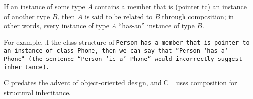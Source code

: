 If an instance of some type $A$ contains a member that is (pointer to) an instance
of another type $B$, then $A$ is said to be related to $B$ through composition;
in other words, every instance of type $A$ ``has-an'' instance of type $B$.

For example, if the class structure of \tt{Person} has a member
that is pointer to an instance of class \tt{Phone}, then we
can say that ``\tt{Person} `has-a' \tt{Phone}'' (the sentence
``\tt{Person} `is-a' \tt{Phone}'' would incorrectly suggest inheritance).

\note C predates the advent of object-oriented design,
and C\_ uses composition for structural inheritance.
